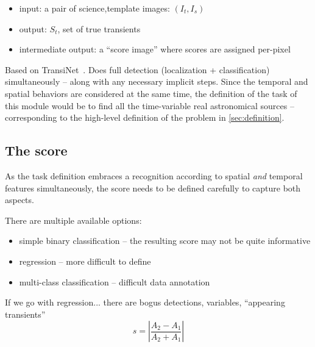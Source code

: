 \begin{itemize}
  \item input: a pair of science,template images: $(I_t,I_s)$
  \item output: $S_t$, set of true transients
  \item intermediate output: a ``score image'' where scores are assigned per-pixel
\end{itemize}

Based on TransiNet~\cite{transinet}. Does full detection (localization + classification) simultaneously -- along with any necessary implicit steps.
Since the temporal and spatial behaviors are considered at the same time, the definition of the task of this module would be to find all the time-variable real astronomical sources -- corresponding to the high-level definition of the problem in \ref{sec:definition}.

\subsection{The score}
As the task definition embraces a recognition according to spatial \emph{and} temporal features simultaneously, the score needs to be defined carefully to capture both aspects.

There are multiple available options:
\begin{itemize}
\item simple binary classification -- the resulting score may not be quite informative
\item regression -- more difficult to define
\item multi-class classification -- difficult data annotation
\end{itemize}

If we go with regression... there are bogus detections, variables, ``appearing transients''
\begin{equation}
  s=\left| \frac{A_2-A_1}{A_2+A_1} \right|
\end{equation}







